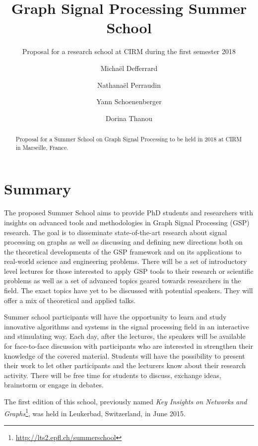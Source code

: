 \documentclass[a4paper]{scrartcl}
\begin{document}
\title{Graph Signal Processing Summer School}
\subtitle{Proposal for a research school at CIRM during the first semester 2018}
\author{
	Michaël Defferrard \and
	Nathanaël Perraudin \and
	Yann Schoenenberger \and
	Dorina Thanou
}
\maketitle

\begin{abstract}
	Proposal for a Summer School on Graph Signal Processing to be held in 2018
	at CIRM in Marseille, France.
\end{abstract}

\section{Summary}

The proposed Summer School aims to provide PhD students and researchers with
insights on advanced tools and methodologies in Graph Signal Processing (GSP)
research. The goal is to disseminate state-of-the-art research about signal
processing on graphs as well as discussing and defining new directions both on
the theoretical developments of the GSP framework and on its applications to
real-world science and engineering problems.
There will be a set of introductory level lectures for those interested to apply
GSP tools to their research or scientific problems as well as a set of advanced
topics geared towards researchers in the field. The exact topics have yet to be
discussed with potential speakers. They will offer a mix of theoretical and
applied talks.

Summer school participants will have the opportunity to learn and study
innovative algorithms and systems in the signal processing field in an
interactive and stimulating way. Each day, after the lectures, the speakers will
be available for face-to-face discussion with participants who are interested in
strengthen their knowledge of the covered material. Students will have the
possibility to present their work to let other participants and the lecturers
know about their research activity. There will be free time for students to
discuss, exchange ideas, brainstorm or engage in debates.

The first edition of this school, previously named \textit{Key Insights on
Networks and Graphs}\footnote{\url{http://lts2.epfl.ch/summerschool}}, was
held in Leukerbad, Switzerland, in June 2015.
\end{document}
